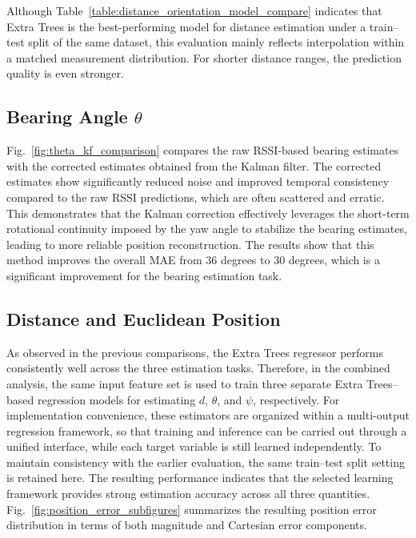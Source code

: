 \documentclass[subscriptcorrection,upint,varvw,barcolor=Goldenrod3,mathalfa=cal=euler,balance,hyphenate,pdf-a]{asmejour}
\begin{document}
Although Table~\ref{table:distance_orientation_model_compare} indicates that Extra Trees is the best-performing model for distance estimation under a train--test split of the same dataset, this evaluation mainly reflects interpolation within a matched measurement distribution. For shorter distance ranges, the prediction quality is even stronger.
\subsection{Bearing Angle \(\theta\)}
Fig.~\ref{fig:theta_kf_comparison} compares the raw RSSI-based bearing estimates with the corrected estimates obtained from the Kalman filter. The corrected estimates show significantly reduced noise and improved temporal consistency compared to the raw RSSI predictions, which are often scattered and erratic. This demonstrates that the Kalman correction effectively leverages the short-term rotational continuity imposed by the yaw angle to stabilize the bearing estimates, leading to more reliable position reconstruction. The results show that this method improves the overall MAE from 36 degrees to 30 degrees, which is a significant improvement for the bearing estimation task.
\subsection{Distance and Euclidean Position}
As observed in the previous comparisons, the Extra Trees regressor performs consistently well across the three estimation tasks. Therefore, in the combined analysis, the same input feature set is used to train three separate Extra Trees--based regression models for estimating \(d\), \(\theta\), and \(\psi\), respectively. For implementation convenience, these estimators are organized within a multi-output regression framework, so that training and inference can be carried out through a unified interface, while each target variable is still learned independently. To maintain consistency with the earlier evaluation, the same train--test split setting is retained here. The resulting performance indicates that the selected learning framework provides strong estimation accuracy across all three quantities. Fig.~\ref{fig:position_error_subfigures} summarizes the resulting position error distribution in terms of both magnitude and Cartesian error components.
\end{document}
